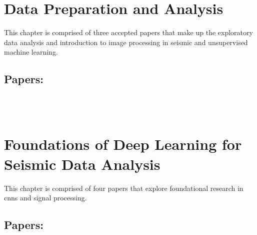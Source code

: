 










\prefrontmatter

\cleartoevenpage

\clearforchapter

\frontmatter






\clearforchapter
\tableofcontents
\clearforchapter
\mylistoftodos

\mainmatter




\chapter{Data Preparation and Analysis}
\label{sec:dataprep}

This chapter is comprised of three accepted papers that make up the exploratory data analysis and introduction to image processing in seismic and unsupervised machine learning.

\vfill
\section*{Papers:}
 \\[1cm]
 \\[1cm]
\vfill




\chapter{Foundations of Deep Learning for Seismic Data Analysis}
\label{sec:foundations}

This chapter is comprised of four papers that explore foundational research in \aclp{cnn} and signal processing.

\vfill
\section*{Papers:}
 \\[1cm]
 \\[1cm]
 \\[1cm]
\vfill






